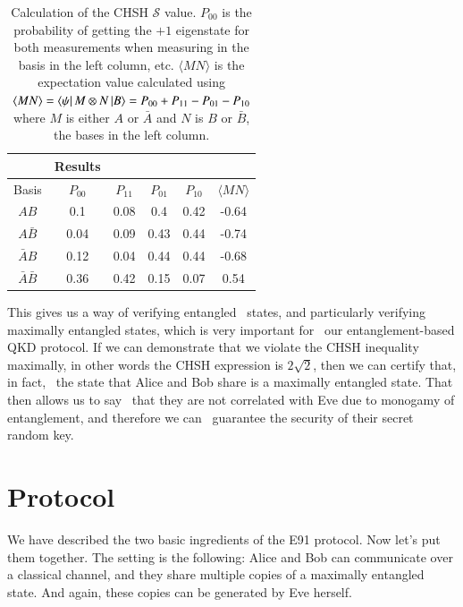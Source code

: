

\begin{table}[t]
    \centering
    \begin{tabular}{c|c|c|c|c|c}
          & Results \\\hline
         Basis & $P_{00}$ & $P_{11}$ & $P_{01}$ & $P_{10}$ & $\langle MN \rangle$ \\
         \hline
        $AB$ & 0.1 & 0.08 & 0.4 & 0.42 & -0.64 \\
         $A\bar{B}$ & 0.04 & 0.09 & 0.43 & 0.44 & -0.74 \\
        $\bar{A}B$ & 0.12 & 0.04 & 0.44 & 0.44 & -0.68 \\
         $\bar{A}\bar{B}$ & 0.36 & 0.42 & 0.15 & 0.07 & 0.54 \\
\hline
\end{tabular}
    \caption{Calculation of the CHSH $\mathcal{S}$ value. $P_{00}$ is the probability of getting the $+1$ eigenstate for both measurements when measuring in the basis in the left column, etc.  $\langle MN \rangle$ is the expectation value calculated using $\langle MN \rangle = \left\langle \psi \right| M\otimes N\left| B \right\rangle = P_{00} + P_{11} - P_{01} - P_{10}$ where $M$ is either $A$ or $\bar{A}$ and $N$ is $B$ or $\bar{B}$, the bases in the left column.}
    \label{tab:chsh-calculation}
\end{table}


This gives us a way of verifying entangled 
states, and particularly verifying maximally
entangled states, which is very important for 
our entanglement-based QKD protocol. If we can
demonstrate that we violate the CHSH inequality 
maximally, in other words the CHSH expression is
$2\sqrt{2}$, then we can certify that, in fact, 
the state that Alice and Bob share is a maximally
entangled state. That then allows us to say 
that they are not correlated with Eve due
to monogamy of entanglement, and therefore we can 
guarantee the security of their secret random key.

\section{Protocol}


We have described the two basic ingredients of the E91 protocol. Now let's put them together. The setting is the following: Alice and Bob can communicate over a classical channel, and they share multiple copies of a maximally entangled state. And again, these copies can be generated by Eve herself.

